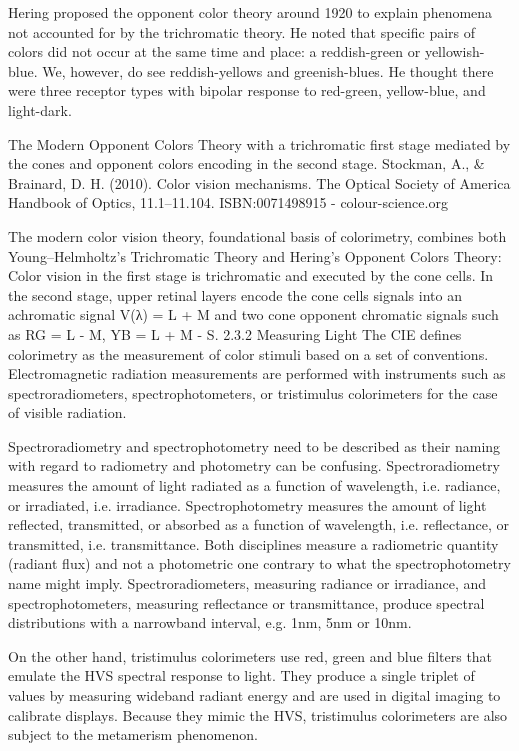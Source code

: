 Hering proposed the opponent color theory around 1920 to explain phenomena not accounted for by the trichromatic theory. He noted that specific pairs of colors did not occur at the same time and place: a reddish-green or yellowish-blue. We, however, do see reddish-yellows and greenish-blues. He thought there were three receptor types with bipolar response to red-green, yellow-blue, and light-dark.

The Modern Opponent Colors Theory with a trichromatic first stage mediated by the cones and opponent colors encoding in the second stage. Stockman, A., & Brainard, D. H. (2010). Color vision mechanisms. The Optical Society of America Handbook of Optics, 11.1–11.104. ISBN:0071498915 - colour-science.org

The modern color vision theory,  foundational basis of colorimetry, combines both Young–Helmholtz's Trichromatic Theory and Hering’s Opponent Colors Theory: Color vision in the first stage is trichromatic and executed by the cone cells. In the second stage, upper retinal layers encode the cone cells signals into an achromatic signal V(λ) = L + M and two cone opponent chromatic signals such as RG = L - M, YB = L + M - S.
2.3.2 Measuring Light
The CIE defines colorimetry as the measurement of color stimuli based on a set of conventions. Electromagnetic radiation measurements are performed with instruments such as spectroradiometers, spectrophotometers, or tristimulus colorimeters for the case of visible radiation.

Spectroradiometry and spectrophotometry need to be described as their naming with regard to radiometry and photometry can be confusing.
Spectroradiometry measures the amount of light radiated as a function of wavelength, i.e. radiance, or irradiated, i.e. irradiance.
Spectrophotometry measures the amount of light reflected, transmitted, or absorbed as a function of wavelength, i.e. reflectance, or transmitted, i.e. transmittance.
Both disciplines measure a radiometric quantity (radiant flux) and not a photometric one contrary to what the spectrophotometry name might imply. Spectroradiometers, measuring radiance or irradiance, and spectrophotometers, measuring reflectance or transmittance, produce spectral distributions with a narrowband interval, e.g. 1nm, 5nm or 10nm.

On the other hand, tristimulus colorimeters use red, green and blue filters that emulate the HVS spectral response to light. They produce a single triplet of values by measuring wideband radiant energy and are used in digital imaging to calibrate displays. Because they mimic the HVS, tristimulus colorimeters are also subject to the metamerism phenomenon.

